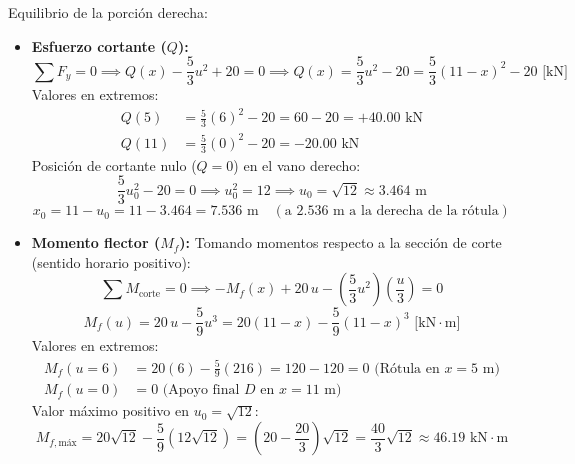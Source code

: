 Equilibrio de la porción derecha:
\begin{itemize}
    \item \textbf{Esfuerzo cortante ($Q$):}
          \begin{equation}
              \sum F_y = 0 \implies Q(x) - \frac{5}{3}u^2 + 20 = 0 \implies Q(x) = \frac{5}{3}u^2 - 20 = \boxed{\frac{5}{3}(11 - x)^2 - 20\text{ [kN]}}
          \end{equation}
          Valores en extremos:
          \begin{align*}
              Q(5)  & = \frac{5}{3}(6)^2 - 20 = 60 - 20 = +40.00\text{ kN} \\
              Q(11) & = \frac{5}{3}(0)^2 - 20 = -20.00\text{ kN}
          \end{align*}
          Posición de cortante nulo ($Q = 0$) en el vano derecho:
          \begin{equation}
              \frac{5}{3}u_0^2 - 20 = 0 \implies u_0^2 = 12 \implies u_0 = \sqrt{12} \approx 3.464\text{ m}
          \end{equation}
          \begin{equation}
              x_0 = 11 - u_0 = 11 - 3.464 = \boxed{7.536\text{ m}} \quad (\text{a } 2.536\text{ m a la derecha de la rótula})
          \end{equation}
    \item \textbf{Momento flector ($M_f$):}
          Tomando momentos respecto a la sección de corte (sentido horario positivo):
          \begin{equation}
              \sum M_{\text{corte}} = 0 \implies -M_f(x) + 20\,u - \left(\frac{5}{3}u^2\right)\left(\frac{u}{3}\right) = 0
          \end{equation}
          \begin{equation}
              \boxed{M_f(u) = 20\,u - \frac{5}{9}u^3 = 20(11 - x) - \frac{5}{9}(11 - x)^3\text{ [kN}\cdot\text{m]}}
          \end{equation}
          Valores en extremos:
          \begin{align*}
              M_f(u=6) & = 20(6) - \frac{5}{9}(216) = 120 - 120 = 0\text{ (Rótula en } x = 5\text{ m)} \\
              M_f(u=0) & = 0\text{ (Apoyo final } D\text{ en } x = 11\text{ m)}
          \end{align*}
          Valor máximo positivo en $u_0 = \sqrt{12}$:
          \begin{equation}
              M_{f,\text{máx}} = 20\sqrt{12} - \frac{5}{9}(12\sqrt{12}) = \left(20 - \frac{20}{3}\right)\sqrt{12} = \frac{40}{3}\sqrt{12} \approx \boxed{46.19\text{ kN}\cdot\text{m}}
          \end{equation}
\end{itemize}


